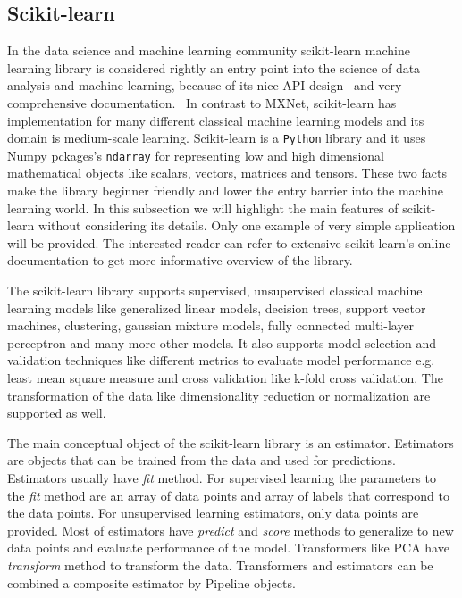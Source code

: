 \documentclass[english, 12pt, a4paper, elec, utf8, online]{aaltothesis}
\begin{document}
\subsection{Scikit-learn}
In the data science and machine learning community scikit-learn machine learning library is considered rightly an entry point into the science of data analysis and machine learning, because of its nice API design~\cite{buitinck2013api} and very comprehensive documentation.~\cite{pedregosa2011scikit} In contrast to MXNet, scikit-learn has implementation for many different classical machine learning models and its domain is medium-scale learning. Scikit-learn is a \texttt{Python} library and it uses Numpy pckages’s \texttt{ndarray} for representing low and high dimensional mathematical objects like scalars, vectors, matrices and tensors. These two facts make the library beginner friendly and lower the entry barrier into the machine learning world. In this subsection we will highlight the main features of scikit-learn without considering its details. Only one example of very simple application will be provided. The interested reader can refer to extensive scikit-learn’s online documentation to get more informative overview of the library.

The scikit-learn library supports supervised, unsupervised classical machine learning models like generalized linear models, decision trees, support vector machines, clustering, gaussian mixture models, fully connected multi-layer perceptron and many more other models. It also supports model selection and validation techniques like different metrics to evaluate model performance e.g. least mean square measure and cross validation like k-fold cross validation. The transformation of the data like dimensionality reduction or normalization are supported as well.

The main conceptual object of the scikit-learn library is an estimator. Estimators are objects that can be trained from the data and used for predictions. Estimators usually have \textit{fit} method. For supervised learning the parameters to the \textit{fit} method are an array of data points and array of labels that correspond to the data points. For unsupervised learning estimators, only data points are provided. Most of estimators have \textit{predict} and \textit{score} methods to generalize to new data points and evaluate performance of the model. Transformers like PCA have \textit{transform} method to transform the data. Transformers and estimators can be combined a composite estimator by Pipeline objects.
\end{document}

